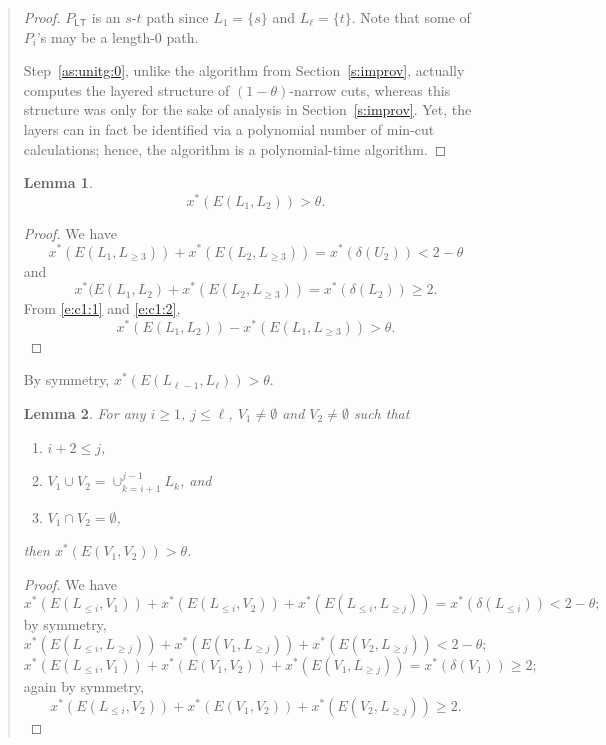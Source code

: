 \documentclass[11pt,letterpaper]{article}
\newtheorem{lemma}{Lemma}
\newcommand{\st}{\mbox{$s$-$t$} }
\begin{document}
\begin{quote}
\begin{proof}
$P_{\mathsf{LT}}$ is an \st path since $L_1=\{s\}$ and $L_\ell=\{t\}$. Note that some of $P_i$'s may be a length-0 path.

Step~\ref{as:unitg:0}, unlike the algorithm from Section~\ref{s:improv}, actually computes the layered structure of $(1-\theta)$-narrow cuts, whereas this structure was only for the sake of analysis in Section~\ref{s:improv}. Yet, the layers can in fact be identified via a polynomial number of min-cut calculations; hence, the algorithm is a polynomial-time algorithm.
\end{proof}

\begin{lemma}\label{l:c1}
\[
x^*(E(L_1,L_2))>\theta
.\]
\end{lemma}
\begin{proof}
We have\begin{equation}\label{e:c1:1}
x^*(E(L_1,L_{\geq 3}))+x^*(E(L_2,L_{\geq 3})) = x^*(\delta(U_2))<2-\theta
\end{equation}and\begin{equation}\label{e:c1:2}
x^*(E(L_1,L_2)+x^*(E(L_2,L_{\geq 3})) = x^*(\delta(L_2))\geq 2
.\end{equation}From \eqref{e:c1:1} and \eqref{e:c1:2},\[
x^*(E(L_1,L_2))-x^*(E(L_1,L_{\geq 3})) >\theta
.\]
\end{proof}
By symmetry, $x^*(E(L_{\ell-1},L_\ell))>\theta$.

\begin{lemma}\label{l:c2}
For any $i\geq 1$, $j\leq\ell$, $V_1\neq\emptyset$ and $V_2\neq\emptyset$ such that\begin{enumerate}
\item $i+2\leq j$,
\item $V_1\cup V_2=\cup_{k=i+1}^{j-1} L_k$, and
\item $V_1\cap V_2 =\emptyset$,
\end{enumerate}then $x^*(E(V_1,V_2))>\theta$.
\end{lemma}
\begin{proof}
We have\begin{equation}\label{e:c2:1}
x^*(E(L_{\leq i},V_1))+x^*(E(L_{\leq i},V_2))+x^*(E(L_{\leq i},L_{\geq j})) = x^*(\delta(L_{\leq i})) <2-\theta
;\end{equation}by symmetry,\begin{equation}\label{e:c2:2}
x^*(E(L_{\leq i},L_{\geq j}))+x^*(E(V_1,L_{\geq j}))+x^*(E(V_2,L_{\geq j})) <2-\theta
;\end{equation}\begin{equation}\label{e:c2:3}
x^*(E(L_{\leq i},V_1))+x^*(E(V_1,V_2))+x^*(E(V_1,L_{\geq j})) = x^*(\delta(V_1)) \geq 2
;\end{equation}again by symmetry,\begin{equation}\label{e:c2:4}
x^*(E(L_{\leq i},V_2))+x^*(E(V_1,V_2))+x^*(E(V_2,L_{\geq j})) \geq 2
.\end{equation}


\end{proof}
\end{quote}
\end{document}
